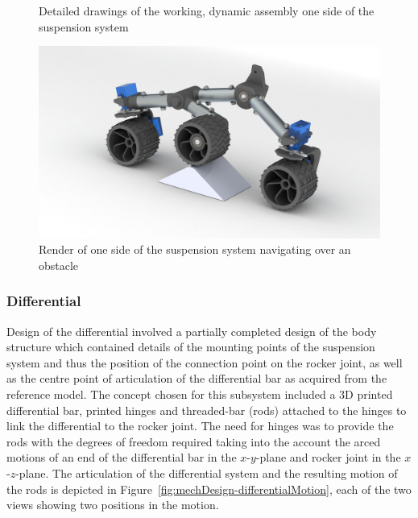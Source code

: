 \begin{figure}[H]
{      }
      \caption[Detailed drawings of the working, dynamic assembly one side of the suspension system]{Detailed drawings of the working, dynamic assembly one side of the suspension system}
      \label{fig:mechDesign-suspensionSubDetail}
      \end{figure}
      
      \begin{figure}[H]
        \centering
        \includegraphics[width=1\linewidth]{figures/suspensionSub-obstacle}
        \caption[Render of one side of the suspension system navigating over an obstacle]{Render of one side of the suspension system navigating over an obstacle}
        \label{fig:mechDesign-suspensionSubObstacle}
      \end{figure}
      
    \subsubsection{Differential}
      Design of the differential involved a partially completed design of the body structure which contained details of the mounting points of the suspension system and thus the position of the connection point on the rocker joint, as well as the centre point of articulation of the differential bar as acquired from the reference model. The concept chosen for this subsystem included a 3D printed differential bar, printed hinges and threaded-bar (rods) attached to the hinges to link the differential to the rocker joint. The need for hinges was to provide the rods with the degrees of freedom required taking into the account the arced motions of an end of the differential bar in the $x$-$y$-plane and rocker joint in the $x$-$z$-plane. The articulation of the differential system and the resulting motion of the rods is depicted in Figure~\ref{fig:mechDesign-differentialMotion}, each of the two views showing two positions in the motion.
      
